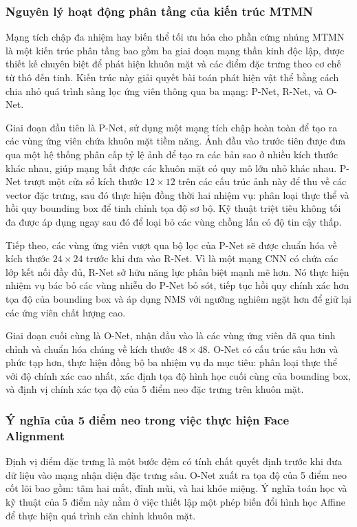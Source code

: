 \subsubsection{Nguyên lý hoạt động phân tầng của kiến trúc MTMN}
Mạng tích chập đa nhiệm hay biến thể tối ưu hóa cho phần cứng nhúng MTMN là một kiến trúc phân tầng bao gồm ba giai đoạn mạng thần kinh độc lập, được thiết kế chuyên biệt để phát hiện khuôn mặt và các điểm đặc trưng theo cơ chế từ thô đến tinh. Kiến trúc này giải quyết bài toán phát hiện vật thể bằng cách chia nhỏ quá trình sàng lọc ứng viên thông qua ba mạng: P-Net, R-Net, và O-Net.

Giai đoạn đầu tiên là P-Net, sử dụng một mạng tích chập hoàn toàn để tạo ra các vùng ứng viên chứa khuôn mặt tiềm năng. Ảnh đầu vào trước tiên được đưa qua một hệ thống phân cấp tỷ lệ ảnh để tạo ra các bản sao ở nhiều kích thước khác nhau, giúp mạng bắt được các khuôn mặt có quy mô lớn nhỏ khác nhau. P-Net trượt một cửa sổ kích thước $12 \times 12$ trên các cấu trúc ảnh này để thu về các vector đặc trưng, sau đó thực hiện đồng thời hai nhiệm vụ: phân loại thực thể và hồi quy bounding box để tinh chỉnh tọa độ sơ bộ. Kỹ thuật triệt tiêu không tối đa được áp dụng ngay sau đó để loại bỏ các vùng chồng lấn có độ tin cậy thấp.

Tiếp theo, các vùng ứng viên vượt qua bộ lọc của P-Net sẽ được chuẩn hóa về kích thước $24 \times 24$ trước khi đưa vào R-Net. Vì là một mạng CNN có chứa các lớp kết nối đầy đủ, R-Net sở hữu năng lực phân biệt mạnh mẽ hơn. Nó thực hiện nhiệm vụ bác bỏ các vùng nhiễu do P-Net bỏ sót, tiếp tục hồi quy chính xác hơn tọa độ của bounding box và áp dụng NMS với ngưỡng nghiêm ngặt hơn để giữ lại các ứng viên chất lượng cao.

Giai đoạn cuối cùng là O-Net, nhận đầu vào là các vùng ứng viên đã qua tinh chỉnh và chuẩn hóa chúng về kích thước $48 \times 48$. O-Net có cấu trúc sâu hơn và phức tạp hơn, thực hiện đồng bộ ba nhiệm vụ đa mục tiêu: phân loại thực thể với độ chính xác cao nhất, xác định tọa độ hình học cuối cùng của bounding box, và định vị chính xác tọa độ của 5 điểm neo đặc trưng trên khuôn mặt.

\subsubsection{Ý nghĩa của 5 điểm neo trong việc thực hiện Face Alignment}
Định vị điểm đặc trưng là một bước đệm có tính chất quyết định trước khi đưa dữ liệu vào mạng nhận diện đặc trưng sâu. O-Net xuất ra tọa độ của 5 điểm neo cốt lõi bao gồm: tâm hai mắt, đỉnh mũi, và hai khóe miệng. Ý nghĩa toán học và kỹ thuật của 5 điểm này nằm ở việc thiết lập một phép biến đổi hình học Affine để thực hiện quá trình căn chỉnh khuôn mặt.

